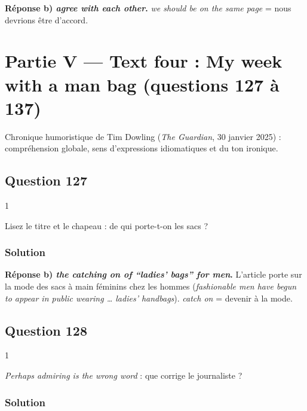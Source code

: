 \documentclass[11pt,a4paper]{article}
\begin{document}
\textbf{Réponse b) \emph{agree with each other}.} \emph{we should be on the same page} = nous devrions être d'accord.

\hypertarget{partie-v-text-four-my-week-with-a-man-bag-questions-127-uxe0-137}{%
\section{Partie V --- Text four : My week with a man bag (questions 127 à 137)}\label{partie-v-text-four-my-week-with-a-man-bag-questions-127-uxe0-137}}

Chronique humoristique de Tim Dowling (\emph{The Guardian}, 30 janvier 2025) : compréhension globale, sens d'expressions idiomatiques et du ton ironique.

\hypertarget{question-127}{%
\subsection{Question 127}\label{question-127}}

\begin{indication}{1}

Lisez le titre et le chapeau : de qui porte-t-on les sacs ?

\end{indication}

\hypertarget{solution-126}{%
\subsubsection{Solution}\label{solution-126}}

\textbf{Réponse b) \emph{the catching on of ``ladies' bags'' for men}.} L'article porte sur la mode des sacs à main féminins chez les hommes (\emph{fashionable men have begun to appear in public wearing \ldots{} ladies' handbags}). \emph{catch on} = devenir à la mode.

\hypertarget{question-128}{%
\subsection{Question 128}\label{question-128}}

\begin{indication}{1}

\emph{Perhaps admiring is the wrong word} : que corrige le journaliste ?

\end{indication}

\hypertarget{solution-127}{%
\subsubsection{Solution}\label{solution-127}}
\end{document}
